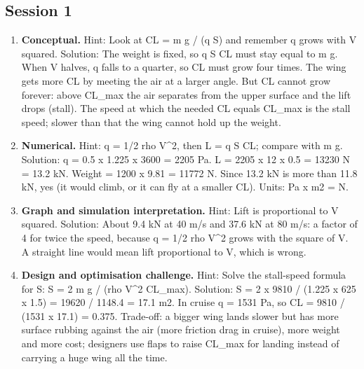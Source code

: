 \documentclass[11pt,a4paper]{article}
\begin{document}
\subsection*{Session 1}
\begin{enumerate}[nosep]
\item \textbf{Conceptual.} Hint: Look at CL = m g / (q S) and remember q grows with V squared. Solution: The weight is fixed, so q S CL must stay equal to m g. When V halves, q falls to a quarter, so CL must grow four times. The wing gets more CL by meeting the air at a larger angle. But CL cannot grow forever: above CL\_max the air separates from the upper surface and the lift drops (stall). The speed at which the needed CL equals CL\_max is the stall speed; slower than that the wing cannot hold up the weight.
\item \textbf{Numerical.} Hint: q = 1/2 rho V\textasciicircum{}2, then L = q S CL; compare with m g. Solution: q = 0.5 x 1.225 x 3600 = 2205 Pa. L = 2205 x 12 x 0.5 = 13230 N = 13.2 kN. Weight = 1200 x 9.81 = 11772 N. Since 13.2 kN is more than 11.8 kN, yes (it would climb, or it can fly at a smaller CL). Units: Pa x m2 = N.
\item \textbf{Graph and simulation interpretation.} Hint: Lift is proportional to V squared. Solution: About 9.4 kN at 40 m/s and 37.6 kN at 80 m/s: a factor of 4 for twice the speed, because q = 1/2 rho V\textasciicircum{}2 grows with the square of V. A straight line would mean lift proportional to V, which is wrong.
\item \textbf{Design and optimisation challenge.} Hint: Solve the stall-speed formula for S: S = 2 m g / (rho V\textasciicircum{}2 CL\_max). Solution: S = 2 x 9810 / (1.225 x 625 x 1.5) = 19620 / 1148.4 = 17.1 m2. In cruise q = 1531 Pa, so CL = 9810 / (1531 x 17.1) = 0.375. Trade-off: a bigger wing lands slower but has more surface rubbing against the air (more friction drag in cruise), more weight and more cost; designers use flaps to raise CL\_max for landing instead of carrying a huge wing all the time.
\end{enumerate}
\end{document}
